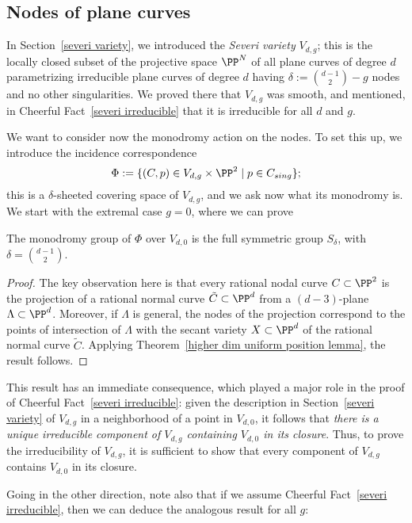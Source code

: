 \subsection{Nodes of plane curves}\label{plane curve nodes}

In Section~\ref{severi variety}, we introduced the \emph{Severi variety} $V_{d,g}$; this is the locally closed subset of the projective space $\PP^N$ of all plane curves of degree $d$ parametrizing irreducible plane curves of degree $d$ having $\delta := \binom{d-1}{2} - g$ nodes and no other singularities. We proved there that $V_{d,g}$ was smooth, and mentioned, in Cheerful Fact~\ref{severi irreducible} that it is irreducible for all $d$ and $g$. 

We want to consider now the monodromy action on the nodes. To set this up, we introduce the incidence correspondence
$$
\Phi := \{(C, p) \in V_{d,g} \times \PP^2 \mid p \in C_{sing} \};
$$ 
this is a $\delta$-sheeted covering space of $V_{d,g}$, and we ask now what its monodromy is. We start with the extremal case $g = 0$, where we can prove

\begin{proposition}
The monodromy group of $\Phi$ over $V_{d,0}$ is the full symmetric group $S_\delta$, with $\delta = \binom{d-1}{2}$.
\end{proposition}

\begin{proof}
The key observation here is that every rational nodal curve $C \subset \PP^2$ is the projection of a rational normal curve $\tilde C \subset \PP^d$ from a $(d-3)$-plane $\Lambda \subset \PP^d$. Moreover, if $\Lambda$ is general,  the nodes of the projection correspond to the points of intersection of $\Lambda$ with the  secant variety $X \subset \PP^d$ of the rational normal curve $\tilde C$. Applying Theorem~\ref{higher dim uniform position lemma}, the result follows.
\end{proof}

This result has an immediate consequence, which played a major role in the proof of Cheerful Fact~\ref{severi irreducible}: given the description in Section~\ref{severi variety} of $V_{d,g}$ in a neighborhood of a point in $V_{d,0}$, it follows that \emph{there is a unique irreducible component of $V_{d,g}$ containing $V_{d,0}$ in its closure}. Thus, to prove the irreducibility of $V_{d,g}$, it is sufficient to show that every component of $V_{d,g}$ contains $V_{d,0}$ in its closure. 

Going in the other direction, note also that if we assume Cheerful Fact~\ref{severi irreducible}, then we can deduce the analogous result for all $g$:


